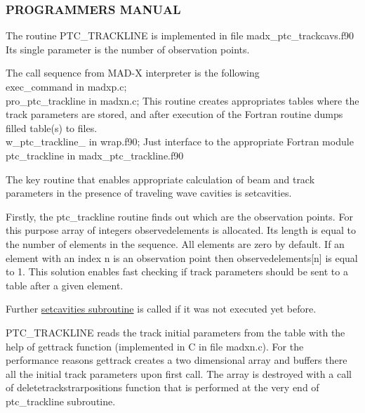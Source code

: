 


\subsubsection{ PROGRAMMERS MANUAL }  The routine PTC\_TRACKLINE is implemented in file madx\_ptc\_trackcavs.f90 Its single parameter is the number of observation points.  

The call sequence from MAD-X interpreter is the following 
\\ exec\_command in madxp.c; 
\\ pro\_ptc\_trackline in madxn.c; This routine creates appropriates tables where the track parameters are stored, and after execution of the Fortran routine dumps filled table(s) to files.
\\ w\_ptc\_trackline\_ in wrap.f90; Just interface to the appropriate Fortran module 
\\ ptc\_trackline in madx\_ptc\_trackline.f90 

The key routine that enables appropriate calculation of beam and track parameters in the presence of traveling wave cavities is setcavities. 

Firstly, the ptc\_trackline routine finds out which are the observation points. For this purpose array of integers observedelements is allocated. Its length is equal to the number of elements in the sequence. All elements are zero by default. If an element with an index n is an observation point then observedelements[n] is equal to 1. This solution enables fast checking if track parameters should be sent to a table after a given element. 

Further \href{../ptc_auxiliaries/PTC_SetCavities.html}{setcavities subroutine} is called if it was not executed yet before. 

PTC\_TRACKLINE reads the track initial parameters from the table with the help of gettrack function (implemented in C in file madxn.c). For the performance reasons gettrack creates a two dimensional array and buffers there all the initial track parameters upon first call. The array is destroyed with a call of deletetrackstrarpositions function that is performed at the very end of ptc\_trackline subroutine. 

